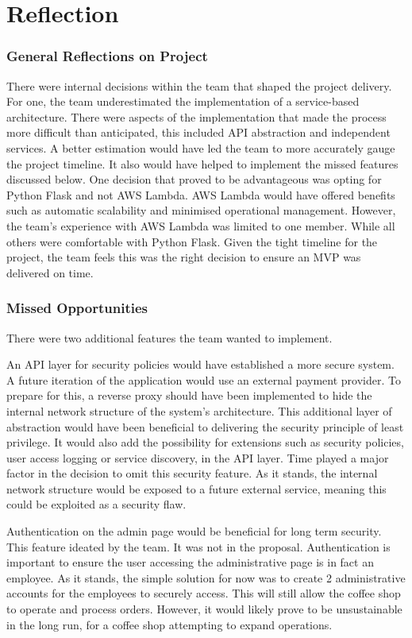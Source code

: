 \documentclass{article}
\begin{document}
\section{Reflection}
\subsubsection*{General Reflections on Project}

There were internal decisions within the team that shaped the project delivery. For one, the team underestimated the implementation of a service-based architecture. There were aspects of the implementation that made the process more difficult than anticipated, this included API abstraction and independent services. A better estimation would have led the team to more accurately gauge the project timeline. It also would have helped to implement the missed features discussed below. One decision that proved to be advantageous was opting for Python Flask and not AWS Lambda. AWS Lambda would have offered benefits such as automatic scalability and minimised operational management. However, the team's experience with AWS Lambda was limited to one member. While all others were comfortable with Python Flask. Given the tight timeline for the project, the team feels this was the right decision to ensure an MVP was delivered on time. 

\subsubsection*{Missed Opportunities}
There were two additional features the team wanted to implement.

\medskip \noindent An API layer for security policies would have established a more secure system. A future iteration of the application would use an external payment provider. To prepare for this, a reverse proxy should have been implemented to hide the internal network structure of the system's architecture. This additional layer of abstraction would have been beneficial to delivering the security principle of least privilege. It would also add the possibility for extensions such as security policies, user access logging or service discovery, in the API layer. Time played a major factor in the decision to omit this security feature. As it stands, the internal network structure would be exposed to a future external service, meaning this could be exploited as a security flaw. 

\medskip \noindent Authentication on the admin page would be beneficial for long term security. This feature ideated by the team. It was not in the proposal. Authentication is important to ensure the user accessing the administrative page is in fact an employee. As it stands, the simple solution for now was to create 2 administrative accounts for the employees to securely access. This will still allow the coffee shop to operate and process orders. However, it would likely prove to be unsustainable in the long run, for a coffee shop attempting to expand operations.
\end{document}

